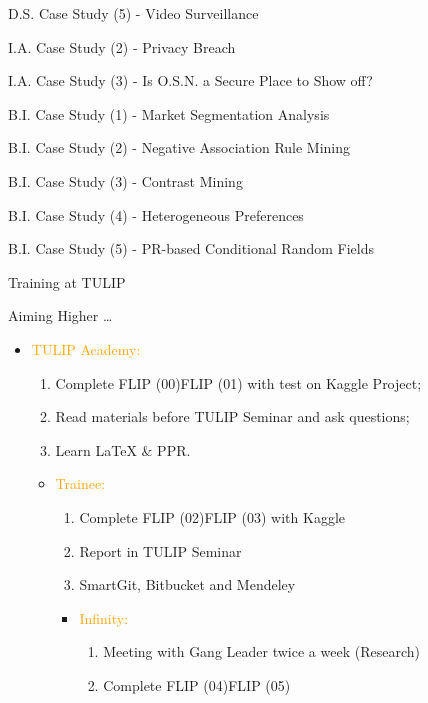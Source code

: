 \documentclass[
 size=14pt,
 paper=smartboard,  %
 mode=present, 		%
 display=slides, 	%
 style=tuliplab,  	%
 pauseslide,
 fleqn,leqno]{powerdot}
\newcommand*{\info}[4][4]{%
  \node [ annotation, #3, text width = #1em,
          inner sep = 2mm ] at (#2) {%
  \list{$\bullet$}{\topsep=0pt\itemsep=0pt\parsep=0pt
    \parskip=0pt\labelwidth=2pt\leftmargin=2pt
    \itemindent=0pt\labelsep=2pt}%
    #4
  \endlist
  };
}
\begin{document}
\begin{slide}[toc=,bm=]{D.S. Case Study (5) - Video Surveillance}
\begin{slide}[toc=,bm=]{I.A. Case Study (2) - Privacy Breach}
\begin{slide}[toc=,bm=]{I.A. Case Study (3) - Is O.S.N. a Secure Place to Show off?}
\begin{slide}[toc=,bm=]{B.I. Case Study (1) - Market Segmentation Analysis}
\begin{slide}[toc=,bm=]{B.I. Case Study (2) - Negative Association Rule Mining}
\begin{slide}[toc=,bm=]{B.I. Case Study (3) - Contrast Mining}
\begin{slide}[toc=,bm=]{B.I. Case Study (4) - Heterogeneous Preferences}
\begin{slide}[toc=,bm=]{B.I. Case Study (5) - PR-based Conditional Random Fields}
\begin{slide}[toc=,bm=]{Training at TULIP}
\begin{center}
\end{center}
\end{slide}

\begin{slide}{Aiming Higher \dots}
    \begin{itemize}
      \item \textcolor{orange}{TULIP Academy:}
       \begin{enumerate}
         \item Complete FLIP (00)\texttildelow FLIP (01) with test on Kaggle Project;
         \item Read materials before TULIP Seminar and ask questions;
         \item Learn \LaTeX{} \& PPR.
       \end{enumerate}
       \begin{itemize}
         \item \textcolor{orange}{Trainee:}
         \begin{enumerate}
           \item Complete  FLIP (02)\texttildelow FLIP (03) with Kaggle
           \item Report in TULIP Seminar
           \item SmartGit, Bitbucket and Mendeley
         \end{enumerate}
         \begin{itemize}
           \item \textcolor{orange}{Infinity:}
            \begin{enumerate}
              \item Meeting with Gang Leader twice a week (Research)
              \item Complete  FLIP (04)\texttildelow FLIP (05)
            \end{enumerate}
         \end{itemize}
       \end{itemize}


\end{itemize}
\end{slide}
\end{slide}
\end{slide}
\end{slide}
\end{slide}
\end{slide}
\end{slide}
\end{slide}
\end{slide}
\end{document}
